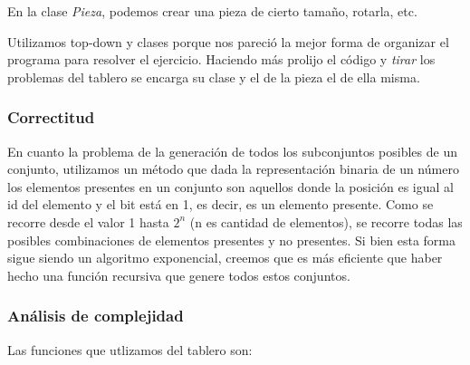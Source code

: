 \quad En la clase \textit{Pieza}, podemos crear una pieza de cierto tama\~no, rotarla, etc.

\quad Utilizamos top-down y clases porque nos pareci\'o la mejor forma de organizar el programa para resolver el ejercicio. Haciendo m\'as prolijo el c\'odigo y \textit{tirar} los problemas del tablero se encarga su clase y el de la pieza el de ella misma.



\subsubsection{Correctitud}

\quad En cuanto la problema de la generaci\'on de todos los subconjuntos posibles de un conjunto, utilizamos un m\'etodo que dada la representaci\'on binaria de un n\'umero los elementos presentes en un conjunto son aquellos donde la posici\'on es igual al id del elemento y el bit est\'a en 1, es decir, es un elemento presente. Como se recorre desde el valor 1 hasta $ 2^{n} $ (n es cantidad de elementos), se recorre todas las posibles  combinaciones de elementos presentes y no presentes. Si bien esta forma sigue siendo un algoritmo exponencial, creemos que es m\'as eficiente que haber hecho una funci\'on recursiva que genere todos estos conjuntos.

\subsubsection{An\'alisis de complejidad}

Las funciones que utlizamos del tablero son:

